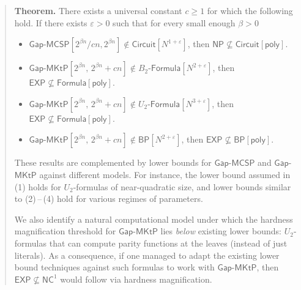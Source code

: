 \documentclass{toc}
\newcommand{\gapmktp}{\mathsf{Gap}$-$\mathsf{MKtP}}
\newcommand{\gapmcsp}{\mathsf{Gap}$-$\mathsf{MCSP}}
\begin{document}
\begin{frontmatter}
\begin{abstract}
\noindent \textbf{Theorem.} There exists a universal constant $c \geq 1$ for which the following hold. If there exists $\varepsilon > 0$ such that for every small enough $\beta > 0$
%
\begin{itemize}
\item[(1)] $\gapmcsp[2^{\beta n}/c n, 2^{\beta n}] \notin \mathsf{Circuit}[N^{1 + \varepsilon}]$, then $\mathsf{NP} \nsubseteq \mathsf{Circuit}[\mathsf{poly}]$.
\vspace{-0.05cm}
\item[(2)] $\gapmktp[2^{\beta n},\, 2^{\beta n} + cn] \notin B_2$-$\mathsf{Formula}[N^{2 + \varepsilon}]$, then $\mathsf{EXP} \nsubseteq \mathsf{Formula}[\mathsf{poly}]$.
\item[(3)] $\gapmktp[2^{\beta n},\, 2^{\beta n} + cn] \notin U_2$-$\mathsf{Formula}[N^{3 + \varepsilon}]$, then $\mathsf{EXP} \nsubseteq \mathsf{Formula}[\mathsf{poly}]$.
\item[(4)] $\gapmktp[2^{\beta n},\, 2^{\beta n} + cn] \notin \mathsf{BP}[N^{2 + \varepsilon}]$, then $\mathsf{EXP} \nsubseteq \mathsf{BP}[\mathsf{poly}]$.
\end{itemize} 
\vspace{-0.1cm}

\noindent These results are complemented by lower bounds for $\gapmcsp$ and $\gapmktp$ against different models. For instance, the lower bound assumed in (1) holds for $U_2$-formulas of near-quadratic size, and lower bounds similar to (2)\,--\,(4) hold for various regimes of parameters.

We also identify a natural computational model under which the hardness magnification threshold for $\gapmktp$ lies \emph{below} existing lower bounds: $U_2$-formulas that can compute parity functions at the leaves (instead of just literals). As a consequence, if one managed to adapt the existing lower bound techniques against such formulas to work with $\gapmktp$, then $\mathsf{EXP} \nsubseteq \mathsf{NC}^1$ would follow via hardness magnification. 
\end{abstract}

%

\end{frontmatter}

%
%
%
\end{document}
